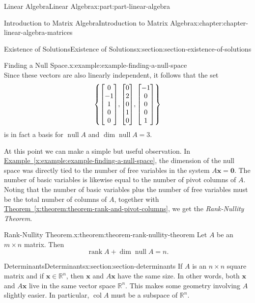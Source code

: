 \documentclass[twoside,10pt,]{book}
\newcommand{\xreffont}{\relax}
\numberwithin{equation}{part}
\newcommand{\RR}{\mathbb{R}}
\providecommand{\vb}[1]{\mathbf{#1}}
\newcommand{\col}[1]{\operatorname{col}{#1}}
\providecommand{\rank}[1]{\operatorname{rank}{#1}}
\newcommand{\nul}[1]{\operatorname{null}{#1}}
\begin{document}
\begin{partptx}{Linear Algebra}{}{Linear Algebra}{}{}{x:part:part-linear-algebra}
\begin{chapterptx}{Introduction to Matrix Algebra}{}{Introduction to Matrix Algebra}{}{}{x:chapter:chapter-linear-algebra-matrices}
\begin{sectionptx}{Existence of Solutions}{}{Existence of Solutions}{}{}{x:section:section-existence-of-solutions}
\begin{example}{Finding a Null Space.}{x:example:example-finding-a-null-space}
\begin{equation*}
\end{equation*}
Since these vectors are also linearly independent, it follows that the set%
\begin{equation*}
\qty{\mqty[0\\-1\\1\\0\\0], \mqty[0\\2\\0\\1\\0], \mqty[-1\\0\\0\\0\\1]}
\end{equation*}
is in fact a basis for \(\nul{A}\) and \(\dim{\nul{A}} = 3\).%
\end{example}
\begin{sageinput}
\end{sageinput}
At this point we can make a simple but useful observation. In \hyperref[x:example:example-finding-a-null-space]{Example~{\xreffont\ref{x:example:example-finding-a-null-space}}}, the dimension of the null space was directly tied to the number of free variables in the system \(A\vb{x} = \vb{0}\). The number of basic variables is likewise equal to the number of pivot columns of \(A\). Noting that the number of basic variables plus the number of free variables must be the total number of columns of \(A\), together with \hyperref[x:theorem:theorem-rank-and-pivot-columns]{Theorem~{\xreffont\ref{x:theorem:theorem-rank-and-pivot-columns}}}, we get the \emph{Rank-Nullity Theorem}.%
\begin{theorem}{Rank-Nullity Theorem.}{}{x:theorem:theorem-rank-nullity-theorem}%
%
Let \(A\) be an \(m\times n\) matrix. Then%
\begin{equation*}
\rank{A} + \dim\nul{A} = n.
\end{equation*}
%
\end{theorem}
\end{sectionptx}
%
%
\typeout{************************************************}
\typeout{************************************************}
%
\begin{sectionptx}{Determinants}{}{Determinants}{}{}{x:section:section-determinants}
If \(A\) is an \(n\times n\) square matrix and if \(\vb{x}\in\RR^n\), then \(\vb{x}\) and \(A\vb{x}\) have the same size. In other words, both \(\vb{x}\) and \(A\vb{x}\) live in the same vector space \(\RR^n\). This makes some geometry involving \(A\) slightly easier. In particular, \(\col{A}\) must be a subspace of \(\RR^n\).%

\end{sectionptx}
\end{chapterptx}
\end{partptx}
\end{document}
